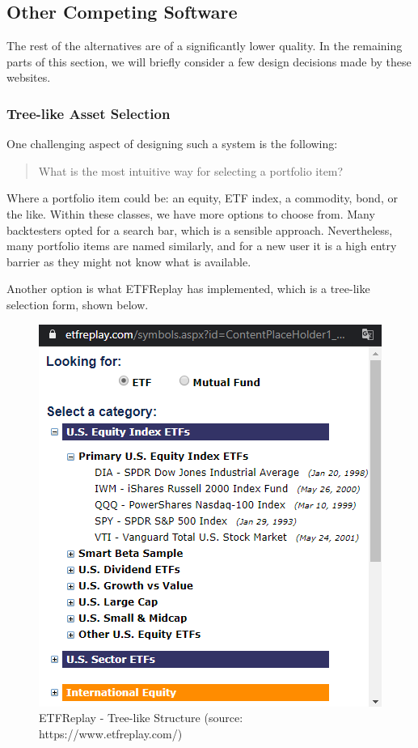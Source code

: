 \documentclass[main.tex]{subfiles}
\begin{document}
\subsection{Other Competing Software}

The rest of the alternatives are of a significantly lower quality. In the remaining parts of this section, we will briefly consider a few design decisions made by these websites.

\subsubsection*{Tree-like Asset Selection}

One challenging aspect of designing such a system is the following: 

\begin{quote}
    What is the most intuitive way for selecting a portfolio item? 
\end{quote}

Where a portfolio item could be: an equity, ETF index, a commodity, bond, or the like. Within these classes, we have more options to choose from. Many backtesters opted for a search bar, which is a sensible approach. Nevertheless, many portfolio items are named similarly, and for a new user it is a high entry barrier as they might not know what is available. 

Another option is what ETFReplay \cite{etfreplay} has implemented, which is a tree-like selection form, shown below. 

\begin{figure}[H]
   \centering
   \includegraphics[scale=0.7]{02Background/02Pictures/etfreplay.png}
   \caption{ETFReplay - Tree-like Structure (source: https://www.etfreplay.com/)}
\end{figure}
\end{document}
